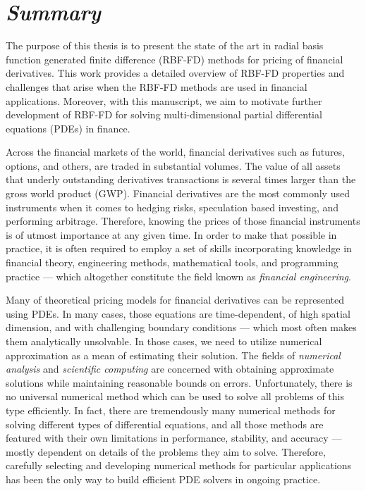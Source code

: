 \documentclass{UUThesisTemplate}
\begin{document}
\newpage
\chapter*{{{\sffamily\emph{Summary}}}}
{\noteunic

\par
The purpose of this thesis is to present the state of the art in radial basis function generated finite difference (RBF-FD) methods for pricing of financial derivatives. This work provides a detailed overview of RBF-FD properties and challenges that arise when the RBF-FD methods are used in financial applications. Moreover, with this manuscript, we aim to motivate further development of RBF-FD for solving multi-dimensional partial differential equations (PDEs) in finance.

\par
Across the financial markets of the world, financial derivatives such as futures, options, and others, are traded in substantial volumes. The value of all assets that underly outstanding derivatives transactions is several times larger than the gross world product (GWP). Financial derivatives are the most commonly used instruments when it comes to hedging risks, speculation based investing, and performing arbitrage. Therefore, knowing the prices of those financial instruments is of utmost importance at any given time. In order to make that possible in practice, it is often required to employ a set of skills incorporating knowledge in financial theory, engineering methods, mathematical tools, and programming practice --- which altogether constitute the field known as \emph{financial engineering}. 

\par
Many of theoretical pricing models for financial derivatives can be represented using PDEs. In many cases, those equations are time-dependent, of high spatial dimension, and with challenging boundary conditions --- which most often makes them analytically unsolvable. In those cases, we need to utilize numerical approximation as a mean of estimating their solution. The fields of \emph{numerical analysis} and \emph{scientific computing} are concerned with obtaining approximate solutions while maintaining reasonable bounds on errors. Unfortunately, there is no universal numerical method which can be used to solve all problems of this type efficiently. In fact, there are tremendously many numerical methods for solving different types of differential equations, and all those methods are featured with their own limitations in performance, stability, and accuracy --- mostly dependent on details of the problems they aim to solve. Therefore, carefully selecting and developing numerical methods for particular applications has been the only way to build efficient PDE solvers in ongoing practice. 

}
\end{document}
